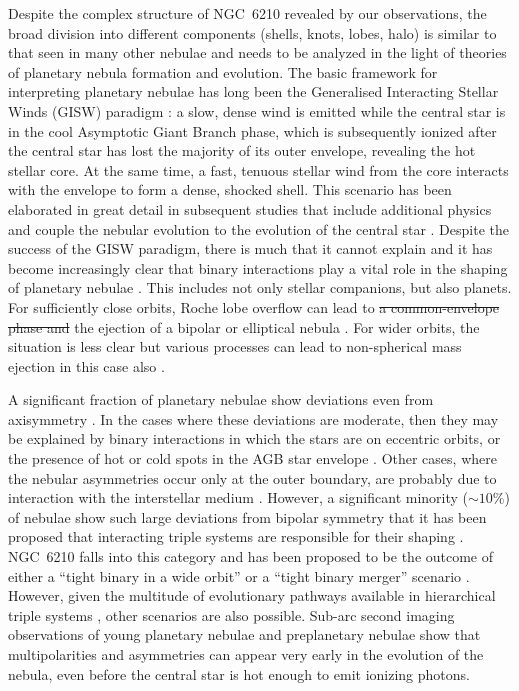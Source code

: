 \documentclass[useAMS, usenatbib]{mnras}
\providecommand{\DIFaddtex}[1]{{\protect\color{red!70!black}\uwave{#1}}} %
\providecommand{\DIFdeltex}[1]{{\protect\color{white!50!black} \ifmmode\cancel{#1}\else\sout{#1}\fi}} %
\providecommand{\DIFaddbegin}{} %
\providecommand{\DIFaddend}{} %
\providecommand{\DIFdelbegin}{} %
\providecommand{\DIFdelend}{} %
\providecommand{\DIFadd}[1]{\texorpdfstring{\DIFaddtex{#1}}{#1}} %
\providecommand{\DIFdel}[1]{\texorpdfstring{\DIFdeltex{#1}}{}} %
\begin{document}
Despite the complex structure of NGC~6210 revealed by our observations,
the broad division into different components (shells, knots, lobes, halo)
is similar to that seen in many other nebulae
\citep{Balick:1987b}
and needs to be analyzed in the light of theories of planetary nebula formation and evolution.
The basic framework for interpreting planetary nebulae has long been the
Generalised Interacting Stellar Winds (GISW) paradigm \citep{Kwok:1978a, Kahn:1985a}:
a slow, dense wind is emitted while the central star is in the cool
Asymptotic Giant Branch phase, which is subsequently ionized after the central star has lost the majority of its outer envelope,
revealing the hot stellar core.
At the same time, a fast, tenuous stellar wind from the core interacts with the envelope to form a dense, shocked shell.
This scenario has been elaborated in great detail in subsequent studies that include additional physics and couple the nebular evolution to the evolution of the central star \citep[for example,][]{Frank:1994b, Garcia-Segura:1997a, Villaver:2002a, Perinotto:2004a, Garcia-Segura:2006a, Steffen:2013a, Toala:2014a}.
Despite the success of the GISW paradigm,
there is much that it cannot explain \citep{Soker:1997a}
and it has become increasingly clear that binary interactions play a vital role in the shaping of planetary nebulae
\citetext{\citealp{Boffin:2019a} and references therein}.
This includes not only stellar companions, but also planets.
For sufficiently close orbits,
\DIFaddbegin \DIFadd{a common-envelope phase and }\DIFaddend Roche lobe overflow can lead to
\DIFdelbegin \DIFdel{a common-envelope phase and }\DIFdelend the ejection of a bipolar or elliptical nebula \citep{Garcia-Segura:2018a}.
For wider orbits, the situation is less clear but various processes can lead to non-spherical mass ejection in this case also \citep{Kim:2012c, Chen:2017b, Chen:2020a}.

A significant fraction of planetary nebulae show deviations even from axisymmetry \citep{Soker:2001a}.
In the cases where these deviations are moderate,
then they may be explained by binary interactions in which the stars are on eccentric orbits,
or the presence of hot or cold spots in the AGB star envelope \citep{Soker:2002b}.
Other cases, where the nebular asymmetries occur only at the outer boundary,
are probably due to interaction with the interstellar medium \citep{Ali:2012a}.
However, a significant minority (\(\sim 10\%\)) of nebulae show such large deviations from bipolar symmetry \citep{Bear:2017a}
that it has been proposed that interacting triple systems are responsible for their shaping \citep{Soker:2004b, Glanz:2020a}.
NGC~6210 falls into this category and has been proposed to be the outcome of either a ``tight binary in a wide orbit'' or a ``tight binary merger'' scenario \citep{Soker:2016b}.
However, given the multitude of evolutionary pathways available in hierarchical triple systems \citep{Toonen:2016a, Toonen:2020a},
other scenarios are also possible.
Sub-arc second imaging observations of young planetary nebulae \citep{Sahai:1998a, Sahai:2011a, Hsia:2014a}
and preplanetary nebulae \citep{Sahai:2007a}
show that multipolarities and asymmetries can appear very early in the evolution of the nebula,
even before the central star is hot enough to emit ionizing photons.
\end{document}
